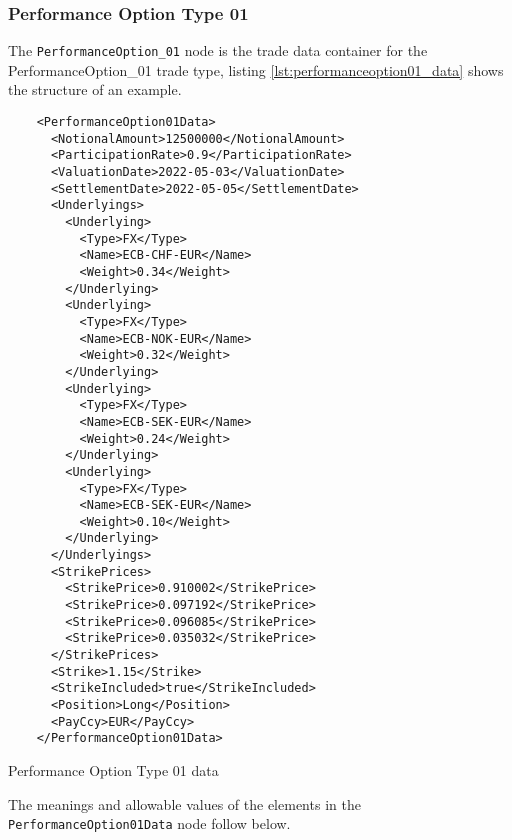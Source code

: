 \subsubsection{Performance Option Type 01}

The \verb+PerformanceOption_01+ node is the trade data container for the PerformanceOption\_01 trade type, listing
\ref{lst:performanceoption01_data} shows the structure of an example.

\begin{listing}[H]
\begin{verbatim}
    <PerformanceOption01Data>
      <NotionalAmount>12500000</NotionalAmount>
      <ParticipationRate>0.9</ParticipationRate>
      <ValuationDate>2022-05-03</ValuationDate>
      <SettlementDate>2022-05-05</SettlementDate>
      <Underlyings>
        <Underlying>
          <Type>FX</Type>
          <Name>ECB-CHF-EUR</Name>
          <Weight>0.34</Weight>
        </Underlying>
        <Underlying>
          <Type>FX</Type>
          <Name>ECB-NOK-EUR</Name>
          <Weight>0.32</Weight>
        </Underlying>
        <Underlying>
          <Type>FX</Type>
          <Name>ECB-SEK-EUR</Name>
          <Weight>0.24</Weight>
        </Underlying>
        <Underlying>
          <Type>FX</Type>
          <Name>ECB-SEK-EUR</Name>
          <Weight>0.10</Weight>
        </Underlying>
      </Underlyings>
      <StrikePrices>
        <StrikePrice>0.910002</StrikePrice>
        <StrikePrice>0.097192</StrikePrice>
        <StrikePrice>0.096085</StrikePrice>
        <StrikePrice>0.035032</StrikePrice>
      </StrikePrices>
      <Strike>1.15</Strike>
      <StrikeIncluded>true</StrikeIncluded>
      <Position>Long</Position>
      <PayCcy>EUR</PayCcy>
    </PerformanceOption01Data>
\end{verbatim}
\caption{Performance Option Type 01 data}
\label{lst:performanceoption01_data}
\end{listing}

The meanings and allowable values of the elements in the \verb+PerformanceOption01Data+  node follow below.

